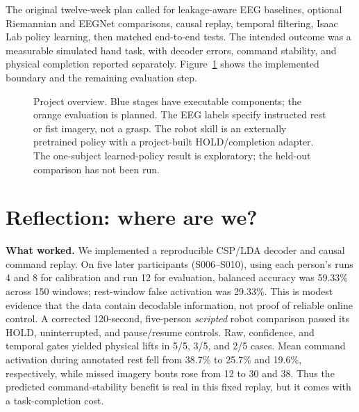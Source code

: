 \documentclass[11pt]{article}
\begin{document}
The original twelve-week plan called for leakage-aware EEG baselines, optional Riemannian and EEGNet comparisons, causal replay, temporal filtering, Isaac Lab policy learning, then matched end-to-end tests. The intended outcome was a measurable simulated hand task, with decoder errors, command stability, and physical completion reported separately. Figure~\ref{fig:pipeline} shows the implemented boundary and the remaining evaluation step.

\begin{figure}[t]
\centering
{}
\caption{Project overview. Blue stages have executable components; the orange evaluation is planned. The EEG labels specify instructed rest or fist imagery, not a grasp. The robot skill is an externally pretrained policy with a project-built HOLD/completion adapter. The one-subject learned-policy result is exploratory; the held-out comparison has not been run.}
\label{fig:pipeline}
\end{figure}

\section{Reflection: where are we?}
\textbf{What worked.} We implemented a reproducible CSP/LDA decoder and causal command replay. On five later participants (S006--S010), using each person's runs 4 and 8 for calibration and run 12 for evaluation, balanced accuracy was 59.33\% across 150 windows; rest-window false activation was 29.33\%. This is modest evidence that the data contain decodable information, not proof of reliable online control. A corrected 120-second, five-person \emph{scripted} robot comparison passed its HOLD, uninterrupted, and pause/resume controls. Raw, confidence, and temporal gates yielded physical lifts in 5/5, 3/5, and 2/5 cases. Mean command activation during annotated rest fell from 38.7\% to 25.7\% and 19.6\%, respectively, while missed imagery bouts rose from 12 to 30 and 38. Thus the predicted command-stability benefit is real in this fixed replay, but it comes with a task-completion cost.
\end{document}
